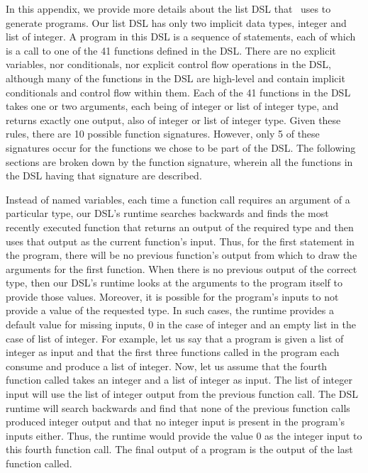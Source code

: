 In this appendix, we provide more details about the list DSL that \scheme\ uses to generate programs.  Our list DSL has only two implicit data types, integer and list of integer.  A program in this DSL is a sequence of statements, each of which is a call to one of the 41 functions defined in the DSL.  There are no explicit variables, nor conditionals, nor explicit control flow operations in the DSL, although many of the functions in the DSL are high-level and contain implicit conditionals and control flow within them.  Each of the 41 functions in the DSL takes one or two arguments, each being of integer or list of integer type, and returns exactly one output, also of integer or list of integer type.  Given these rules, there are 10 possible function signatures.  However, only 5 of these signatures occur for the functions we chose to be part of the DSL.  The following sections are broken down by the function signature, wherein all the functions in the DSL having that signature are described.

Instead of named variables, each time a function call requires an argument of a particular type, our DSL's runtime searches backwards and finds the most recently executed function that returns an output of the required type and then uses that output as the current function's input.  Thus, for the first statement in the program, there will be no previous function's output from which to draw the arguments for the first function.  When there is no previous output of the correct type, then our DSL's runtime looks at the arguments to the program itself to provide those values.  Moreover, it is possible for the program's inputs to not provide a value of the requested type.  In such cases, the runtime provides a default value for missing inputs, 0 in the case of integer and an empty list in the case of list of integer.  For example, let us say that a program is given a list of integer as input and that the first three functions called in the program each consume and produce a list of integer.  Now, let us assume that the fourth function called takes an integer and a list of integer as input.  The list of integer input will use the list of integer output from the previous function call.  The DSL runtime will search backwards and find that none of the previous function calls produced integer output and that no integer input is present in the program's inputs either.  Thus, the runtime would provide the value 0 as the integer input to this fourth function call.  The final output of a program is the output of the last function called.


